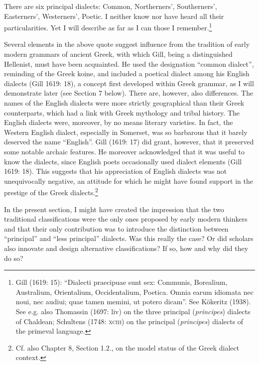 \begin{styleQuote}
There are six principal dialects: Common, Northerners’, Southerners’, Easterners’, Westerners’, Poetic. I neither know nor have heard all their particularities. Yet I will describe as far as I can those I remember.\footnote{ Gill (1619: 15): “Dialecti praecipuae sunt sex: Communis, Borealium, Australium, Orientalium, Occidentalium, Poetica. Omnia earum idiomata nec noui, nec audiui; quae tamen memini, ut potero dicam”. See Kökeritz (1938). See e.g. also Thomassin (1697: liv) on the three principal (\textit{principes}) dialects of Chaldean; Schultens (1748: \textsc{xciii}) on the principal (\textit{principes}) dialects of the primeval language.}
\end{styleQuote}

\begin{styleStandard}
Several elements in the above quote suggest influence from the tradition of early modern grammars of ancient Greek, with which Gill, being a distinguished Hellenist, must have been acquainted. He used the designation “common dialect”, reminding of the Greek koine, and included a poetical dialect among his English dialects (Gill 1619: 18), a concept first developed within Greek grammar, as I will demonstrate later (see Section 7 below). There are, however, also differences. The names of the English dialects were more strictly geographical than their Greek counterparts, which had a link with Greek mythology and tribal history. The English dialects were, moreover, by no means literary varieties. In fact, the Western English dialect, especially in Somerset, was so barbarous that it barely deserved the name “English”. Gill (1619: 17) did grant, however, that it preserved some notable archaic features. He moreover acknowledged that it was useful to know the dialects, since English poets occasionally used dialect elements (Gill 1619: 18). This suggests that his appreciation of English dialects was not unequivocally negative, an attitude for which he might have found support in the prestige of the Greek dialects.\footnote{ Cf. also Chapter 8, Section 1.2., on the model status of the Greek dialect context.}
\end{styleStandard}

\begin{styleStandard}
In the present section, I might have created the impression that the two traditional classifications were the only ones proposed by early modern thinkers and that their only contribution was to introduce the distinction between “principal” and “less principal” dialects. Was this really the case? Or did scholars also innovate and design alternative classifications? If so, how and why did they do so?
\end{styleStandard}

